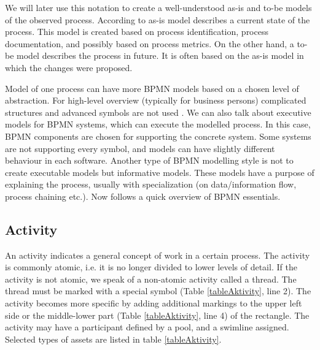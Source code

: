 \documentclass[thesis=M,english]{FITthesis}[2019/12/23]
\begin{document}
We will later use this notation to create a well-understood as-is and to-be models of the observed process. According to \cite{fundementalsBPNM} as-is model describes a current state of the process. This model is created based on process identification, process documentation, and possibly based on process metrics. On the other hand, a to-be model describes the process in future. It is often based on the as-is model in which the changes were proposed.

Model of one process can have more BPMN models based on a chosen level of abstraction. For high-level overview (typically for business persons) complicated structures and advanced symbols are not used . We can also talk about executive models for BPMN systems, which can execute the modelled process. In this case, BPMN components are chosen for supporting the concrete system. Some systems are not supporting every symbol, and models can have slightly different behaviour in each software. Another type of BPMN modelling style is not to create executable models but informative models. These models have a purpose of explaining the process, usually with specialization (on data/information flow, process chaining etc.). Now follows a quick overview of BPMN essentials.

\subsection{Activity}
An activity indicates a general concept of work in a certain process. The activity is commonly atomic, i.e. it is no longer divided to lower levels of detail. If the activity is not atomic, we speak of a non-atomic activity called a thread. The thread must be marked with a special symbol (Table \ref{tableAktivity}, line 2). The activity becomes more specific by adding additional markings to the upper left side or the middle-lower part (Table \ref{tableAktivity}, line 4) of the rectangle. The activity may have a participant defined by a pool, and a swimline assigned. Selected types of assets are listed in table \ref{tableAktivity}.
\end{document}
